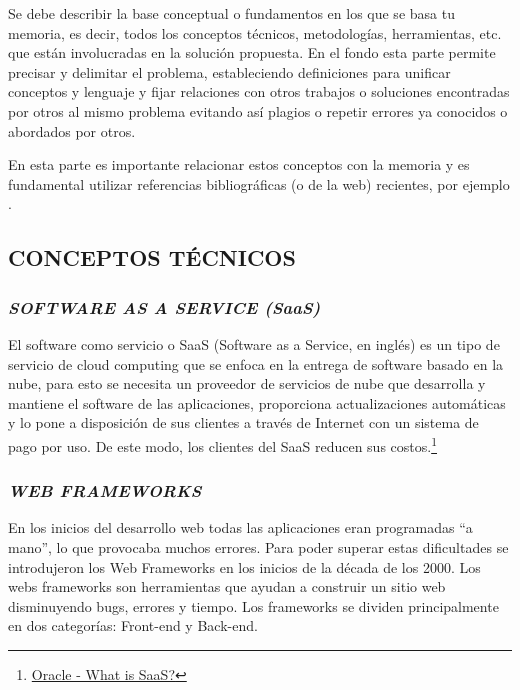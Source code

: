 
Se debe describir la base conceptual o fundamentos en los que se basa tu memoria, es decir, todos los conceptos técnicos, metodologías, herramientas, etc. que están involucradas en la solución propuesta. En el fondo esta parte permite precisar y delimitar el problema, estableciendo definiciones para unificar conceptos y lenguaje y fijar relaciones con otros trabajos o soluciones encontradas por otros al mismo problema evitando así plagios o repetir errores ya conocidos o abordados por otros.

En esta parte es importante relacionar estos conceptos con la memoria y es fundamental utilizar referencias bibliográficas (o de la web) recientes, por ejemplo \cite{gettelfinger2004will}.
\subsection{CONCEPTOS TÉCNICOS}

\subsubsection{\textit{SOFTWARE AS A SERVICE (SaaS)}} 

El software como servicio o SaaS (Software as a Service, en inglés) es un tipo de servicio de cloud computing que se enfoca en la entrega de software basado en la nube, para esto se necesita un proveedor de servicios de nube que desarrolla y mantiene el software de las aplicaciones, proporciona actualizaciones automáticas y lo pone a disposición de sus clientes a través de Internet con un sistema de pago por uso. De este modo, los clientes del SaaS reducen sus costos.\footnote{\href{https://www.oracle.com/applications/what-is-saas/}{Oracle - What is SaaS?}}

\subsubsection{\textit{WEB FRAMEWORKS}}

En los inicios del desarrollo web todas las aplicaciones eran programadas “a mano”, lo que provocaba muchos errores. Para poder superar estas dificultades se introdujeron los Web Frameworks en los inicios de la década de los 2000. Los webs frameworks son herramientas que ayudan a construir un sitio web disminuyendo bugs, errores y tiempo. Los frameworks se dividen principalmente en dos categorías: Front-end y Back-end. \cite{analysiswf} 

